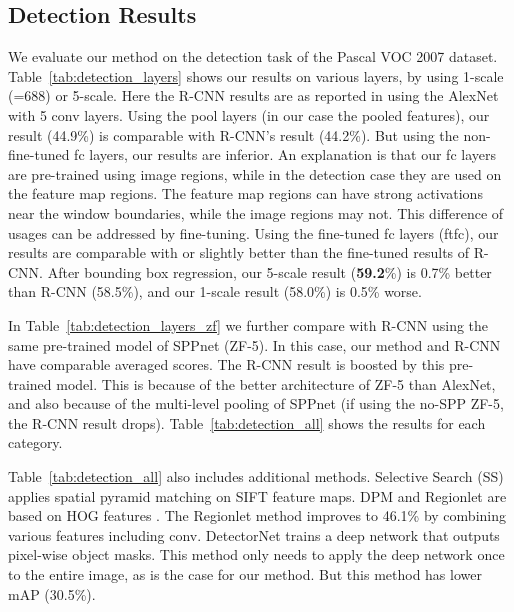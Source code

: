 \documentclass[10pt,journal,cspaper,compsoc]{IEEEtran}
\begin{document}
\subsection{Detection Results}

We evaluate our method on the detection task of the Pascal VOC 2007 dataset.
Table~\ref{tab:detection_layers} shows our results on various layers, by using 1-scale (=688) or 5-scale.
Here the R-CNN results are as reported in \cite{Girshick2014} using the AlexNet \cite{Krizhevsky2012} with 5 conv layers.
Using the pool layers (in our case the pooled features), our result (44.9\%) is comparable with R-CNN's result (44.2\%).
But using the non-fine-tuned fc layers, our results are inferior. An explanation is that our fc layers are pre-trained using image regions, while in the detection case they are used on the feature map regions. The feature map regions can have strong activations near the window boundaries, while the image regions may not. This difference of usages can be addressed by fine-tuning. Using the fine-tuned fc layers (ftfc), our results are comparable with or slightly better than the fine-tuned results of R-CNN. After bounding box regression, our 5-scale result (\textbf{59.2}\%) is 0.7\% better than R-CNN (58.5\%), and our 1-scale result (58.0\%) is 0.5\% worse.

In Table~\ref{tab:detection_layers_zf} we further compare with R-CNN using the same pre-trained model of SPPnet (ZF-5). In this case, our method and R-CNN have comparable averaged scores. The R-CNN result is boosted by this pre-trained model. This is because of the better architecture of ZF-5 than AlexNet, and also because of the multi-level pooling of SPPnet (if using the no-SPP ZF-5, the R-CNN result drops). Table~\ref{tab:detection_all} shows the results for each category.

Table~\ref{tab:detection_all} also includes additional methods.
Selective Search (SS) \cite{Sande2011} applies spatial pyramid matching on SIFT feature maps. DPM \cite{Felzenszwalb2010} and Regionlet \cite{Wang2013} are based on HOG features \cite{Dalal2005}. The Regionlet method improves to 46.1\% \cite{Will2014} by combining various features including conv.
DetectorNet \cite{Szegedy2013} trains a deep network that outputs pixel-wise object masks. This method only needs to apply the deep network once to the entire image, as is the case for our method. But this method has lower mAP (30.5\%).
\end{document}
